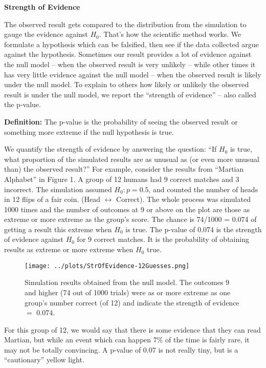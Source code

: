 \begin{center}
        {\large\bf Strength of Evidence}
 \end{center}
      The observed result gets compared to the distribution from the
      simulation to gauge the evidence against $H_0$.  That's
      how the scientific method works.  We formulate a hypothesis
      which can be falsified, then see if the data collected argue
      against the hypothesis. Sometimes our result provides a lot of
      evidence against the null model  -- when the observed result is very
      unlikely -- while other times it has very little evidence against
      the null model -- when the observed result is likely under the null
      model. To explain to others  how likely or unlikely the
      observed result is under the null model, we  report the
      ``strength of evidence'' -- also called  the p-value.

       {\bf Definition:} The p-value is the probability of seeing the observed 
       result or something more  extreme if the null
       hypothesis is true. 
 
       We quantify the strength of evidence by answering the question:
       ``If $H_0$ is true, what proportion of the simulated results
       are as unusual as (or even more unusual than) the observed
       result?''  For example, consider the results from ``Martian
       Alphabet'' in Figure 1. A group of 12 humans had 9 correct
       matches and 3 incorrect. The simulation assumed $H_0: p = 0.5$,
       and counted the number of heads in 12 flips of a fair
       coin. (Head $\leftrightarrow$ Correct).  The whole process was
       simulated 1000 times and the number of outcomes at 9 or above
       on the plot are those as extreme or more extreme as the group's
       score. The chance is 74/1000 = 0.074 of getting a result this
       extreme when $H_0$ is true.  The p-value of 0.074 is the
       strength of evidence against $H_0$ for 9 correct matches. It is
       the probability of obtaining results as extreme or more extreme
       when $H_0$ true. 

 \begin{figure}[h]
   \centering
  \texttt{[image: ../plots/StrOfEvidence-12Guesses.png]}

   \caption{ Simulation results obtained from the null model. The
      outcomes 9 and higher (74 out of 1000 trials) were as or more extreme
      as one group's number correct (of 12) and indicate the strength of
      evidence $=$ 0.074. }
   \label{fig:SOE-12}
 \end{figure}
  For this group of 12, we would say that there is some evidence that
  they can read Martian, but while an  event which can happen  7\% of
  the time is   fairly rare, it may not be totally convincing.  
  A p-value  of 0.07 is not really tiny, but is  a ``cautionary'' yellow
  light. 

